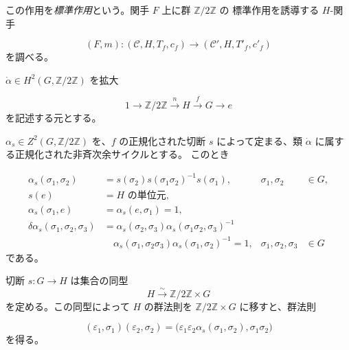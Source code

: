 \clearpage
{}%
この作用を\emph{標準作用}という。関手 $F$ 上に群 $\mathbb Z/2\mathbb Z$ の
標準作用を誘導する $H$-関手

\begin{equation}
  (F,m)\colon(\mathcal C,H,T_f,c_f)
  \longrightarrow(\mathcal C',H,T'_f,c'_f)
  \tag{1.4.3.3}
\end{equation}
を調べる。

$\dot\alpha\in H^2(G,\mathbb Z/2\mathbb Z)$ を拡大

\begin{equation}
  1\longrightarrow\mathbb Z/2\mathbb Z
  \xrightarrow{n}H\xrightarrow{f}G\longrightarrow e
  \tag{1.4.3.4}
\end{equation}
を記述する元とする。

$\alpha_s\in Z^2(G,\mathbb Z/2\mathbb Z)$ を、$f$ の正規化された切断 $s$
によって定まる、類 $\dot\alpha$ に属する正規化された非斉次余サイクルとする。
このとき

\begin{equation}
  \begin{aligned}
    \alpha_s(\sigma_1,\sigma_2)
      &=s(\sigma_2)s(\sigma_1\sigma_2)^{-1}s(\sigma_1),
      & \sigma_1,\sigma_2&\in G,\\
    s(e)&=H\text{ の単位元},\\
    \alpha_s(\sigma_1,e)&=\alpha_s(e,\sigma_1)=1,\\
    \delta\alpha_s(\sigma_1,\sigma_2,\sigma_3)
      &=\alpha_s(\sigma_2,\sigma_3)
        \alpha_s(\sigma_1\sigma_2,\sigma_3)^{-1}\\
      &\quad{}\alpha_s(\sigma_1,\sigma_2\sigma_3)
        \alpha_s(\sigma_1,\sigma_2)^{-1}=1,
      & \sigma_1,\sigma_2,\sigma_3&\in G
  \end{aligned}
  \tag{1.4.3.5}
\end{equation}
である。

切断 $s\colon G\to H$ は集合の同型
\[
  H\xrightarrow{\sim}\mathbb Z/2\mathbb Z\times G
\]
を定める。この同型によって $H$ の群法則を
$\mathbb Z/2\mathbb Z\times G$ に移すと、群法則

\begin{equation}
  (\varepsilon_1,\sigma_1)(\varepsilon_2,\sigma_2)
  =\bigl(\varepsilon_1\varepsilon_2
    \alpha_s(\sigma_1,\sigma_2),\sigma_1\sigma_2\bigr)
  \tag{1.4.3.6}
\end{equation}
を得る。

